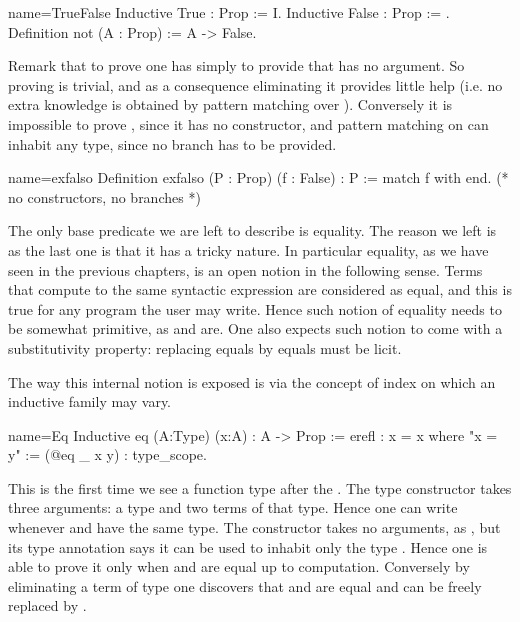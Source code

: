 \begin{coq}{name=TrueFalse}{}
Inductive True : Prop := I.
Inductive False : Prop := .
Definition not (A : Prop) := A -> False.
\end{coq}

Remark that to prove  one has simply to provide  that has no
argument.  So proving  is trivial, and as a consequence eliminating it
provides little help (i.e. no extra knowledge is obtained by pattern matching
over ).  Conversely it is impossible to prove , since it has no
constructor, and pattern matching on  can inhabit any type, since no
branch has to be provided.

\begin{coq}{name=exfalso}{}
Definition exfalso (P : Prop) (f : False) : P :=
  match f with end.  (* no constructors, no branches *)
\end{coq}

The only base predicate we are left to describe is equality.  The reason we
left is as the last one is that it has a tricky nature.  In particular
equality, as we have seen in the previous chapters, is an open notion
in the following sense.  Terms that compute to the same syntactic expression
are considered as equal, and this is true for any program the user may write.
Hence such notion of equality needs to be somewhat primitive, as 
 and  are.  One also expects such notion to come
with a substitutivity property: replacing equals by equals must be licit.

The way this internal notion is exposed is via the concept of index
on which an inductive family may vary.

\begin{coq}{name=Eq}{}
Inductive eq (A:Type) (x:A) : A -> Prop := erefl : x = x
where "x = y" := (@eq _ x y) : type_scope.
\end{coq}

This is the first time we see a function type after the \C{:}.
The  type constructor takes three arguments: a type  and
two terms of that type.  Hence one can write  whenever  and 
have the same type.
The  constructor takes no arguments, as , but its type
annotation says it can be used to inhabit only the type .
Hence one is able to prove  it only when  and  are
equal up to computation.  Conversely by eliminating a term
of type  one discovers that   and  are
equal and  can be freely replaced by .

